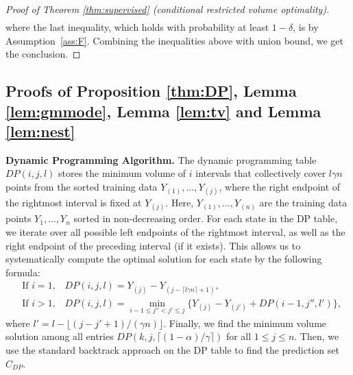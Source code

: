 \begin{proof}[Proof of Theorem \ref{thm:supervised} (conditional restricted volume optimality)]
\begin{align*}
\end{align*}
where the last inequality, which holds with probability at least $1-\delta$, is by Assumption~\ref{ass:F}. Combining the inequalities above with union bound, we get the conclusion.
\end{proof}



\subsection{Proofs of Proposition \ref{thm:DP}, Lemma \ref{lem:gmmode}, Lemma \ref{lem:tv} and Lemma \ref{lem:nest}} \label{sec:proof_of_lemmas}

\textbf{Dynamic Programming Algorithm.} 
The dynamic programming table $DP(i,j,l)$ stores the minimum volume of $i$ intervals that collectively cover $l \gamma n$ points from the sorted training data $Y_{(1)}, \dots, Y_{(j)}$, where the right endpoint of the rightmost interval is fixed at $Y_{(j)}$. Here, $Y_{(1)}, \dots, Y_{(n)}$ are the training data points $Y_1,\dots, Y_n$ sorted in non-decreasing order.
For each state in the DP table, we iterate over all possible left endpoints of the rightmost interval, as well as the right endpoint of the preceding interval (if it exists). This allows us to systematically compute the optimal solution for each state by the following formula:
\begin{align*}
&\text{If $i = 1$,} \quad DP(i,j,l) = Y_{(j)} - Y_{(j-\lceil l\gamma n \rceil +1)},\\
&\text{If $i > 1$,} \quad DP(i,j,l) = \min_{i-1\leq j''< j' \leq j}\{Y_{(j)} - Y_{(j')} + DP(i-1, j'', l')\},
\end{align*}
where $l' = l - \lfloor (j - j' + 1)/(\gamma n) \rfloor$.
Finally, we find the minimum volume solution among all entries $DP(k,j,\lceil(1-\alpha)/ \gamma\rceil)$ for all $1\leq j\leq n$.
Then, we use the standard backtrack approach on the DP table to find the prediction set $\widehat C_{DP}$.

